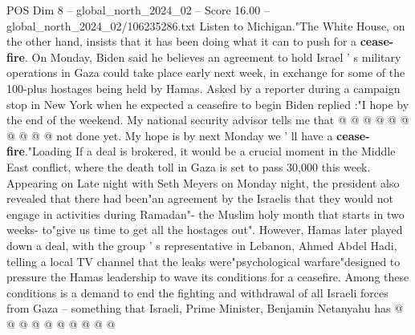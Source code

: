 \begin{textsample}{POS Dim 8 – global\_north\_2024\_02 – Score 16.00 – global\_north\_2024\_02/106235286.txt}
Listen to Michigan."The White House, on the other hand, insists that it has been doing what it can to push for a \textbf{cease-fire}.
On Monday, Biden said he believes an agreement to hold Israel ' s military operations in Gaza could take place early next week, in exchange for some of the 100-plus hostages being held by Hamas.
Asked by a reporter during a campaign stop in New York when he expected a ceasefire to begin Biden replied :"I hope by the end of the weekend.
My national security advisor tells me that @ @ @ @ @ @ @ @ @ @ not done yet.
My hope is by next Monday we ' ll have a \textbf{cease-fire}."Loading If a deal is brokered, it would be a crucial moment in the Middle East conflict, where the death toll in Gaza is set to pass 30,000 this week.
Appearing on Late night with Seth Meyers on Monday night, the president also revealed that there had been"an agreement by the Israelis that they would not engage in activities during Ramadan"- the Muslim holy month that starts in two weeks- to"give us time to get all the hostages out".
However, Hamas later played down a deal, with the group ' s representative in Lebanon, Ahmed Abdel Hadi, telling a local TV channel that the leaks were"psychological warfare"designed to pressure the Hamas leadership to wave its conditions for a ceasefire.
Among these conditions is a demand to end the fighting and withdrawal of all Israeli forces from Gaza -- something that Israeli, Prime Minister, Benjamin Netanyahu has @ @ @ @ @ @ @ @ @ @

\end{textsample}
